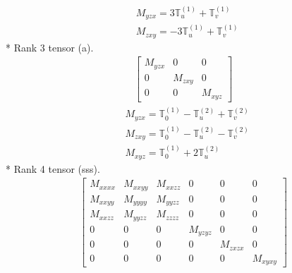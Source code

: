 \documentclass[fleqn,8pt,landscape]{jsarticle}
\begin{document}
\begin{align*}
& M_{yzx} = 3 \mathbb{T}_{u}^{(1)} + \mathbb{T}_{v}^{(1)} \\
& M_{zxy} = - 3 \mathbb{T}_{u}^{(1)} + \mathbb{T}_{v}^{(1)}
\end{align*}
* Rank 3 tensor (a).
\begin{align*}
\begin{bmatrix} M_{yzx} & 0 & 0 \\ 0 & M_{zxy} & 0 \\ 0 & 0 & M_{xyz} \end{bmatrix}
\end{align*}
\begin{align*}
& M_{yzx} = \mathbb{T}_{0}^{(1)} - \mathbb{T}_{u}^{(2)} + \mathbb{T}_{v}^{(2)} \\
& M_{zxy} = \mathbb{T}_{0}^{(1)} - \mathbb{T}_{u}^{(2)} - \mathbb{T}_{v}^{(2)} \\
& M_{xyz} = \mathbb{T}_{0}^{(1)} + 2 \mathbb{T}_{u}^{(2)}
\end{align*}
* Rank 4 tensor (sss).
\begin{align*}
\begin{bmatrix} M_{xxxx} & M_{xxyy} & M_{xxzz} & 0 & 0 & 0 \\ M_{xxyy} & M_{yyyy} & M_{yyzz} & 0 & 0 & 0 \\ M_{xxzz} & M_{yyzz} & M_{zzzz} & 0 & 0 & 0 \\ 0 & 0 & 0 & M_{yzyz} & 0 & 0 \\ 0 & 0 & 0 & 0 & M_{zxzx} & 0 \\ 0 & 0 & 0 & 0 & 0 & M_{xyxy} \end{bmatrix}
\end{align*}
\end{document}
